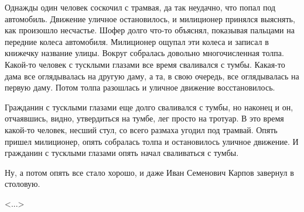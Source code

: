 Однажды один человек соскочил с трамвая, да так неудачно, что попал под автомобиль. Движение уличное остановилось, и милиционер принялся выяснять, как произошло несчастье. Шофер долго что-то объяснял, показывая пальцами на передние колеса автомобиля. Милиционер ощупал эти колеса и записал в книжечку название улицы. Вокруг собралась довольно многочисленная толпа. Какой-то человек с тусклыми глазами все время сваливался с тумбы. Какая-то дама все оглядывалась на другую даму, а та, в свою очередь, все оглядывалась на первую даму. Потом толпа разошлась и уличное движение восстановилось.

Гражданин с тусклыми глазами еще долго сваливался с тумбы, но наконец и он, отчаявшись, видно, утвердиться на тумбе, лег просто на тротуар. В это время какой-то человек, несший стул, со всего размаха угодил под трамвай. Опять пришел милиционер, опять собралась толпа и остановилось уличное движение. И гражданин с тусклыми глазами опять начал сваливаться с тумбы.

Ну, а потом опять все стало хорошо, и даже Иван Семенович Карпов завернул в столовую.

\vspace{0.5em}
\hfill \textless ...\textgreater